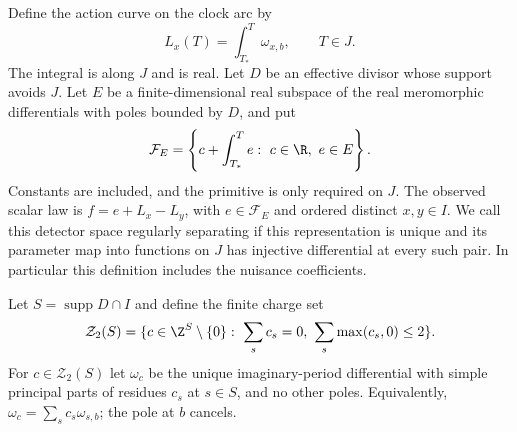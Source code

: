 Define the action curve on the clock arc by
\begin{equation}\label{eq:v86-intrinsic-curve}
            L_x(T)=\int_{T_*}^{T}\omega_{x,b},\qquad T\in J.
\end{equation}
The integral is along $J$ and is real. Let $D$ be an effective divisor
whose support avoids $J$. Let $E$ be a finite-dimensional real subspace
of the real meromorphic differentials with poles bounded by $D$, and
put
\begin{equation}\label{eq:v86-intrinsic-detectors}
 \mathcal F_E=\left\{c+\int_{T_*}^{T}e:\ c\in\R,
                                             \ e\in E\right\}.
\end{equation}
Constants are included, and the primitive is only required on $J$.
The observed scalar law is $f=e+L_x-L_y$, with $e\in\mathcal F_E$
and ordered distinct $x,y\in I$. We call this detector space regularly
separating if this representation is unique and its parameter map into
functions on $J$ has injective differential at every such pair. In
particular this definition includes the nuisance coefficients.

Let $S=\operatorname{supp}D\cap I$ and define the finite charge set
\[
 \mathcal Z_2(S)=\{c\in\Z^S\setminus\{0\}:\ \sum_s c_s=0,
                                      \ \sum_s\max(c_s,0)\le2\}.
\]
For $c\in\mathcal Z_2(S)$ let $\omega_c$ be the unique
imaginary-period differential with simple principal parts of residues
$c_s$ at $s\in S$, and no other poles. Equivalently,
$\omega_c=\sum_s c_s\omega_{s,b}$; the pole at $b$ cancels.

